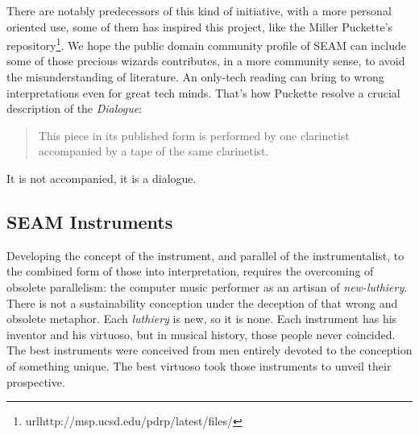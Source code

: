 \documentclass[twoside,a4paper]{article}
\begin{document}
There are notably predecessors of this kind of initiative, with a more personal oriented use, some of them has inspired this project, like the Miller Puckette's repository\footnote{url{http://msp.ucsd.edu/pdrp/latest/files/}}. We hope the public domain community profile of SEAM can include some of those precious wizards contributes, in a more community sense, to avoid the misunderstanding of literature. An only-tech reading can bring to wrong interpretations even for great tech minds. That's how Puckette \cite{mp01} resolve a crucial description of the \emph{Dialogue}:

\begin{quote}
This piece in its published form is performed by one clarinetist accompanied by a tape of the same clarinetist.
\end{quote}

It is not accompanied, it is a dialogue. 


\subsection{SEAM Instruments}

Developing the concept of the instrument, and parallel of the instrumentalist, \cite{lem16,mp01,savi85} to the combined form of those into interpretation, requires the overcoming of obsolete parallelism: the computer music performer as an artisan of \emph{new-luthiery}. There is not a sustainability conception under the deception of that wrong and obsolete metaphor. Each \emph{luthiery} is new, so it is none. Each instrument has his inventor and his virtuoso, but in musical history, those people never coincided. The best instruments were conceived from men entirely devoted to the conception of something unique. The best virtuoso took those instruments to unveil their prospective.

\end{document}
